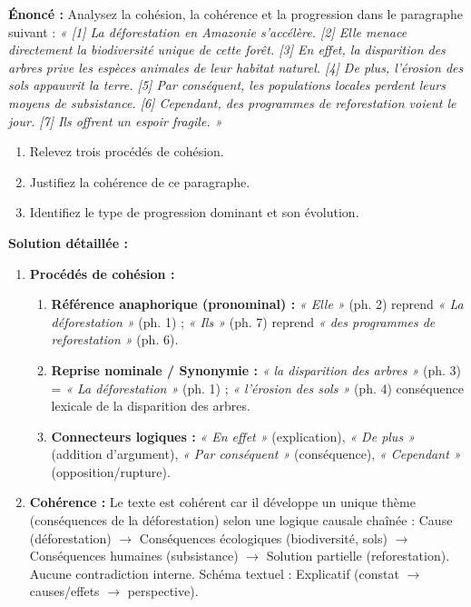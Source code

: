 \documentclass[11pt]{article}
\newcommand{\cle}[1]{{\popxbold\color{popdark}#1}}
\begin{document}
\begin{exoresolu}
    \textbf{Énoncé :} Analysez la cohésion, la cohérence et la progression dans le paragraphe suivant :
    \medskip
    \emph{« [1] La déforestation en Amazonie s'accélère. [2] Elle menace directement la biodiversité unique de cette forêt. [3] En effet, la disparition des arbres prive les espèces animales de leur habitat naturel. [4] De plus, l'érosion des sols appauvrit la terre. [5] Par conséquent, les populations locales perdent leurs moyens de subsistance. [6] Cependant, des programmes de reforestation voient le jour. [7] Ils offrent un espoir fragile. »}
    \begin{enumerate}
        \item Relevez trois procédés de cohésion.
        \item Justifiez la cohérence de ce paragraphe.
        \item Identifiez le type de progression dominant et son évolution.
    \end{enumerate}
    \tcblower
    \textbf{Solution détaillée :}
    \begin{enumerate}
        \item \textbf{Procédés de cohésion :}
            \begin{enumerate}
                \item \textbf{Référence anaphorique (pronominal) :} \emph{« Elle »} (ph. 2) reprend \emph{« La déforestation »} (ph. 1) ; \emph{« Ils »} (ph. 7) reprend \emph{« des programmes de reforestation »} (ph. 6).
                \item \textbf{Reprise nominale / Synonymie :} \emph{« la disparition des arbres »} (ph. 3) = \emph{« La déforestation »} (ph. 1) ; \emph{« l'érosion des sols »} (ph. 4) conséquence lexicale de la disparition des arbres.
                \item \textbf{Connecteurs logiques :} \emph{« En effet »} (explication), \emph{« De plus »} (addition d'argument), \emph{« Par conséquent »} (conséquence), \emph{« Cependant »} (opposition/rupture).
            \end{enumerate}
        \item \textbf{Cohérence :} Le texte est \cle{cohérent} car il développe un unique \cle{thème} (conséquences de la déforestation) selon une logique \cle{causale} chaînée : Cause (déforestation) $\rightarrow$ Conséquences écologiques (biodiversité, sols) $\rightarrow$ Conséquences humaines (subsistance) $\rightarrow$ Solution partielle (reforestation). Aucune contradiction interne. Schéma textuel : \cle{Explicatif} (constat $\rightarrow$ causes/effets $\rightarrow$ perspective).

\end{enumerate}
\end{exoresolu}
\end{document}
